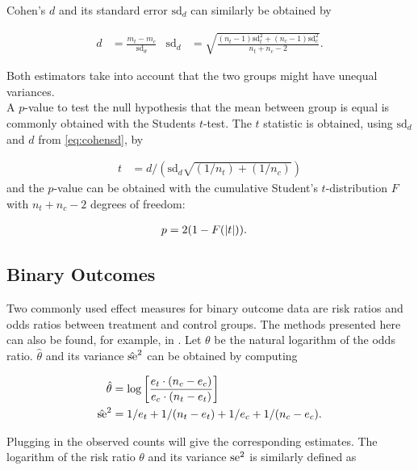 \documentclass[11pt,a4paper,twoside]{book}\usepackage[]{graphicx}\usepackage[]{color}
\begin{document}
Cohen's $d$ and its standard error $\textrm{sd}_d$ can similarly be obtained by

\begin{align}
d &= \frac{m_t - m_c}{\textrm{sd}_\theta} & 
\textrm{sd}_d &= \sqrt{\frac{(n_t - 1)\textrm{sd}_t^2 + (n_c - 1)\textrm{sd}_c^2}{n_t + n_c - 2}}. \label{eq:cohensd}
\end{align}

Both estimators take into account that the two groups might have unequal variances. \\ 
A  $p$\hspace{0.4mm}-value to test the null hypothesis that the mean between group is equal is commonly obtained with the Students $t$-test. The $t$ statistic is obtained, using $\textrm{sd}_d$ and $d$ from \eqref{eq:cohensd}, by

\begin{align}
t &= d/(\textrm{sd}_d\sqrt{(1/n_t)+(1/n_c)}) \nonumber
\end{align}
and the  $p$\hspace{0.4mm}-value can be obtained with the cumulative Student's $t$-distribution $F$ with $n_t + n_c - 2$ degrees of freedom:

\begin{align}
p &= 2(1-F(\left\lvert t\right\rvert)). \nonumber
\end{align}


\subsection{Binary Outcomes}
Two commonly used effect measures for binary outcome data are risk ratios and odds ratios between treatment and control groups. 
The methods presented here can also be found, for example, in \cite[34]{Intro.meta}.
Let $\theta$ be the natural logarithm of the odds ratio. $\hat{\theta}$ and its variance $\hat{\operatorname{se}}^2$ can be obtained by computing

\begin{align}
\hat{\theta} &= \log\bigg[\frac{e_t\cdot(n_c - e_c)}{e_c\cdot(n_t - e_t)}\bigg] \nonumber \\
\hat{\operatorname{se}}^2 &= 1/e_t + 1/(n_t - e_t) + 1/e_c + 1/(n_c - e_c). \nonumber
\end{align}

Plugging in the observed counts will give the corresponding estimates. The logarithm of the risk ratio $\theta$ and its variance $\operatorname{se}^2$ is similarly defined as
\end{document}
